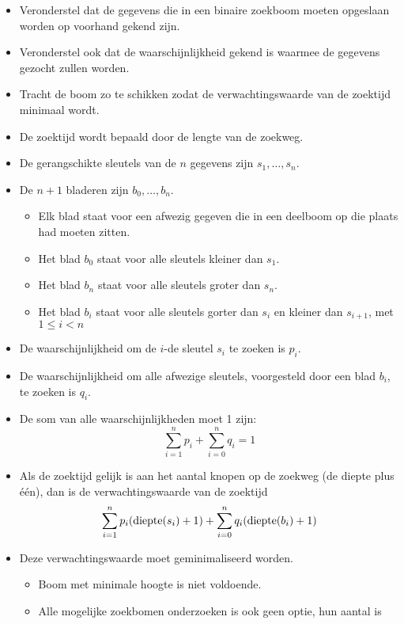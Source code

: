 \begin{itemize}
    \item Veronderstel dat de gegevens die in een binaire zoekboom moeten opgeslaan worden op voorhand gekend zijn.
    \item Veronderstel ook dat de waarschijnlijkheid gekend is waarmee de gegevens gezocht zullen worden.
    \item Tracht de boom zo te schikken zodat de verwachtingswaarde van de zoektijd minimaal wordt.
    \item De zoektijd wordt bepaald door de lengte van de zoekweg.
    \item De gerangschikte sleutels van de $n$ gegevens zijn $s_1, \dots, s_n$.
    \item De $n + 1$ bladeren zijn $b_0, \dots, b_n$.
    \begin{itemize}
        \item Elk blad staat voor een afwezig gegeven die in een deelboom op die plaats had moeten zitten.
        \item Het blad $b_0$ staat voor alle sleutels kleiner dan $s_1$.
        \item Het blad $b_n$ staat voor alle sleutels groter dan $s_n$.
        \item Het blad $b_i$ staat voor alle sleutels gorter dan $s_i$ en kleiner dan $s_{i +1}$, met $1 \leq i < n$
    \end{itemize}
    \item De waarschijnlijkheid om de $i$-de sleutel $s_i$ te zoeken is $p_i$. 
    \item De waarschijnlijkheid om alle afwezige sleutels, voorgesteld door een blad $b_i$, te zoeken is $q_i$.
    \item De som van alle waarschijnlijkheden moet 1 zijn:
    $$\sum_{i = 1}^n p_i + \sum_{i = 0}^n q_i = 1$$
    \item Als de zoektijd gelijk is aan het aantal knopen op de zoekweg (de diepte plus één), dan is de verwachtingswaarde van de zoektijd
    $$\sum_{i = 1}^n p_i (\hbox{diepte}(s_i) + 1) + \sum_{i = 0}^n q_i (\hbox{diepte}(b_i) + 1)$$
    \item Deze verwachtingswaarde moet geminimaliseerd worden.
    \begin{itemize}
        \item Boom met minimale hoogte is niet voldoende.
        \item Alle mogelijke zoekbomen onderzoeken is ook geen optie, hun aantal is 
        \begin{align*}

\end{align*}
\end{itemize}
\end{itemize}
